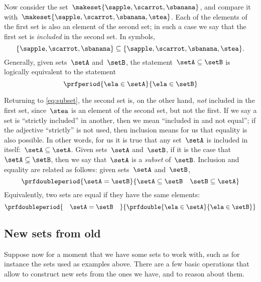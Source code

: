 Now consider the set~$\makeset{ \sapple, \scarrot, \sbanana }$, and compare it with~$\makeset{ \sapple, \scarrot, \sbanana, \stea }$.
Each of the elements of the first set is also an element of the second set;
in such a case we say that the first set is \emph{included} in the second set.
In symbols,
%
\begin{equation}
    \label{eq:subset}
    \{ \sapple, \scarrot, \sbanana \} \subseteq \{ \sapple, \scarrot, \sbanana, \stea \}.
\end{equation}
%
Generally, given sets~$\setA$ and~$\setB$, the statement~$\setA \subseteq \setB$ is logically equivalent to the statement
%
\begin{equation*}
    \prfperiod{
        \ela \in \setA
    }{
        \ela \in \setB
    }
\end{equation*}

Returning to \cref{eq:subset}, the second set is, on the other hand, \emph{not} included in the first set, since~$\stea$ is an element of the second set, but not the first.
If we say a set is ``strictly included'' in another, then we mean ``included in and not equal'';
if the adjective ``strictly'' is not used, then inclusion means for us that equality is also possible.
In other words, for us it is true that any set~$\setA$ is included in itself:~$\setA \subseteq \setA$.
Given sets~$\setA$ and~$\setB$, if it is the case that~$\setA \subseteq \setB$, then we say that~$\setA$ is a \emph{subset} of~$\setB$.
Inclusion and equality are related as follows: given sets~$\setA$ and~$\setB$,
%
\begin{equation*}
    \prfdoubleperiod{
        \setA = \setB
    }{
        {\setA \subseteq \setB}
        \quad
        {\setB \subseteq \setA}
    }
\end{equation*}
%
Equivalently, two sets are equal if they have the same elements:
\begin{equation*}
    \prfdoubleperiod{
        \quad \setA = \setB \quad
    }{
        \prfdouble{
            \ela \in \setA
        }{
            \ela \in \setB
        }
    }
\end{equation*}


\subsection{New sets from old}

Suppose now for a moment that we have some sets to work with, such as for instance the sets used as examples above.
There are a few basic operations that allow to construct new sets from the ones we have, and to reason about them.

